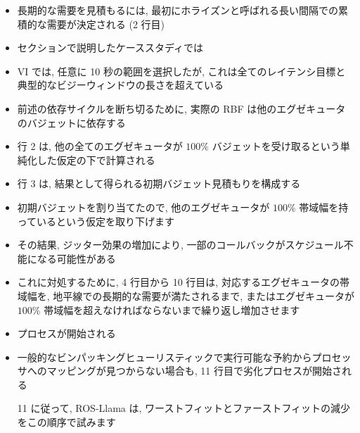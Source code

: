 \begin{frame}{}
    \begin{itemize}
        \item 長期的な需要を見積もるには, 最初にホライズンと呼ばれる長い間隔での累積的な需要が決定される (2 行目)
        \item セクションで説明したケーススタディでは
        \item VI では, 任意に 10 秒の範囲を選択したが, これは全てのレイテンシ目標と典型的なビジーウィンドウの長さを超えている
        \item 前述の依存サイクルを断ち切るために, 実際の RBF は他のエグゼキュータのバジェットに依存する
        \item 行 2 は, 他の全てのエグゼキュータが $100 \%$ バジェットを受け取るという単純化した仮定の下で計算される
        \item 行 3 は, 結果として得られる初期バジェット見積もりを構成する
    \end{itemize}
\end{frame}

\begin{frame}{}
    \begin{itemize}
        \item 初期バジェットを割り当てたので, 他のエグゼキュータが $100 \%$ 帯域幅を持っているという仮定を取り下げます
        \item その結果, ジッター効果の増加により, 一部のコールバックがスケジュール不能になる可能性がある
        \item これに対処するために, 4 行目から 10 行目は, 対応するエグゼキュータの帯域幅を, 地平線での長期的な需要が満たされるまで, またはエグゼキュータが $100 \%$ 帯域幅を超えなければならないまで繰り返し増加させます
        \item プロセスが開始される
    \end{itemize}
\end{frame}

\begin{frame}{}
    \begin{itemize}
        \item 一般的なビンパッキングヒューリスティックで実行可能な予約からプロセッサへのマッピングが見つからない場合も, 11 行目で劣化プロセスが開始される
        \item [11] に従って, ROS-Llama は, ワーストフィットとファーストフィットの減少をこの順序で試みます
    \end{itemize}
\end{frame}

